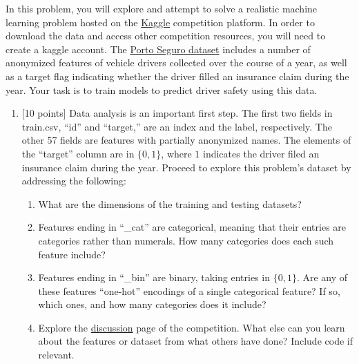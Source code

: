 \documentclass[12pt]{article}
\newenvironment{problem}[2][Problem:]{\begin{trivlist}
\item[\hskip \labelsep {\bfseries #1}\hskip \labelsep {\bfseries #2.}]}{\end{trivlist}}
\begin{document}
\begin{problem}{Porto Seguro Dataset [65 points]}
In this problem, you will explore and attempt to solve a realistic machine learning problem hosted on the \href{https://www.kaggle.com/}{Kaggle} competition platform.
In order to download the data and access other competition resources, you will need to create a kaggle account. 
The \href{https://www.kaggle.com/c/porto-seguro-safe-driver-prediction/data}{Porto Seguro dataset} includes a number of anonymized features of vehicle drivers collected over the course of a year, as well as a target flag indicating whether the driver filled an insurance claim during the year.
Your task is to train models to predict driver safety using this data. 

\begin{enumerate}
    \item {[10 points]} 
    Data analysis is an important first step. 
    The first two fields in train.csv, ``id'' and ``target,'' are an index and the label, respectively. 
    The other 57 fields are features with partially anonymized names. 
    The elements of the ``target'' column are in $\{0,1\}$, where $1$ indicates the driver filed an insurance claim during the year.
    Proceed to explore this problem's dataset by addressing the following:
    \begin{enumerate}
            \item What are the dimensions of the training and testing datasets?
            \item Features ending in ``\_cat'' are categorical, meaning that their entries are categories rather than numerals. How many categories does each such feature include?
            \item Features ending in ``\_bin'' are binary, taking entries in $\{0,1\}$. Are any of these features ``one-hot'' encodings of a single categorical feature? If so, which ones, and how many categories does it include? 
            \item Explore the \href{https://www.kaggle.com/c/porto-seguro-safe-driver-prediction/discussion}{discussion} page of the competition. What else can you learn about the features or dataset from what others have done? Include code if relevant.
    \end{enumerate}


\end{enumerate}
\end{problem}
\end{document}
